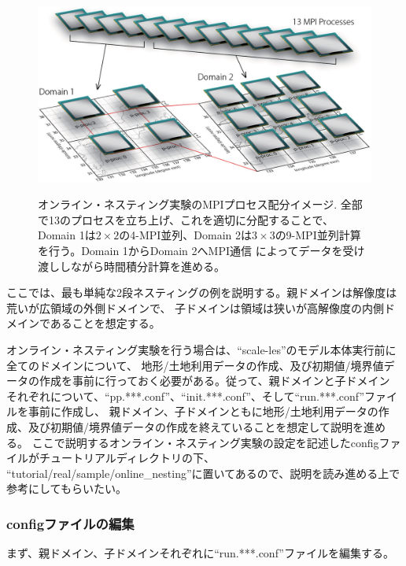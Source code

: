 \begin{figure}[t]
\begin{center}
  \includegraphics[width=0.8\hsize]{./figure/mpisplit_nesting.eps}\\
  \caption{オンライン・ネスティング実験のMPIプロセス配分イメージ. 全部で13のプロセスを立ち上げ、これを適切に分配することで、
           Domain 1は$2 \times 2$の4-MPI並列、Domain 2は$3 \times 3$の9-MPI並列計算を行う。Domain 1からDomain 2へMPI通信
           によってデータを受け渡ししながら時間積分計算を進める。}
  \label{fig_mpisplit}
\end{center}
\end{figure}


ここでは、最も単純な2段ネスティングの例を説明する。親ドメインは解像度は荒いが広領域の外側ドメインで、
子ドメインは領域は狭いが高解像度の内側ドメインであることを想定する。

オンライン・ネスティング実験を行う場合は、``scale-les''のモデル本体実行前に全てのドメインについて、
地形/土地利用データの作成、及び初期値/境界値データの作成を事前に行っておく必要がある。従って、親ドメインと子ドメイン
それぞれについて、``pp.***.conf''、``init.***.conf''、そして``run.***.conf''ファイルを事前に作成し、
親ドメイン、子ドメインともに地形/土地利用データの作成、及び初期値/境界値データの作成を終えていることを想定して説明を進める。
ここで説明するオンライン・ネスティング実験の設定を記述したconfigファイルがチュートリアルディレクトリの下、
``tutorial/real/sample/online\_nesting''に置いてあるので、説明を読み進める上で参考にしてもらいたい。


\subsubsection{configファイルの編集}
まず、親ドメイン、子ドメインそれぞれに``run.***.conf''ファイルを編集する。

